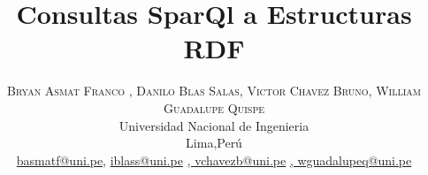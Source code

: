 \documentclass[conference]{IEEEtran}
\begin{document}
\title{\bf{Consultas SparQl a Estructuras RDF}}

\begin{comment}
\author{\IEEEauthorblockN{Asmat Franco, Bryan}
\IEEEauthorblockA{\textit{Universidad Nacional de Ingeniería} \\
Lima, Perú \\
\texttt{basmatf@uni.pe}}
\and
\IEEEauthorblockN{Blas Salas, Israel}
\IEEEauthorblockA{\textit{Universidad Nacional de Ingeniería} \\
Lima, Perú \\
\texttt{iblass@uni.pe}}
\and
\IEEEauthorblockN{Chavez Bruno, Victor}
\IEEEauthorblockA{\textit{Universidad Nacional de Ingeniería} \\
Lima, Perú \\
\texttt{vchavezb@uni.pe}}
\and
\IEEEauthorblockN{Guadalupe Quispe, William}
\IEEEauthorblockA{\textit{Universidad Nacional de Ingeniería} \\
Lima, Perú \\
\texttt{wguadalupeq@uni.pe}}
}
\end{comment}
\author{%
\textsc{Bryan Asmat Franco }\textsc{, Danilo Blas Salas}\textsc{, Victor Chavez Bruno}\textsc{, William Guadalupe Quispe}\\
	\normalsize Universidad Nacional de Ingenieria \\ %
\normalsize Lima,Perú \\ %
\normalsize \href{mailto:basmatf@uni.pe}{basmatf@uni.pe},  \href{mailto:iblass@uni.pe}{iblass@uni.pe} \href{mailto:vchavezb@uni.pe}{,  vchavezb@uni.pe} \href{mailto:wguadalupeq@uni.pe}{,  wguadalupeq@uni.pe} %
}





\maketitle
\end{document}
